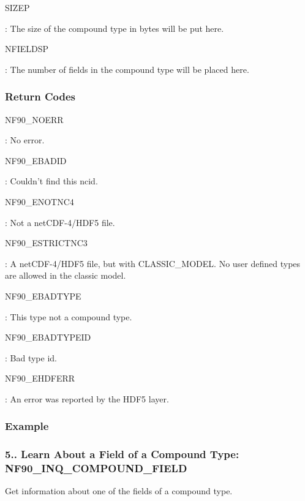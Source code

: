 {\ttfamily S\+I\+Z\+EP}

\+: The size of the compound type in bytes will be put here.

{\ttfamily N\+F\+I\+E\+L\+D\+SP}

\+: The number of fields in the compound type will be placed here.

\subsubsection*{Return Codes}

{\ttfamily N\+F90\+\_\+\+N\+O\+E\+RR}

\+: No error.

{\ttfamily N\+F90\+\_\+\+E\+B\+A\+D\+ID}

\+: Couldn’t find this ncid.

{\ttfamily N\+F90\+\_\+\+E\+N\+O\+T\+N\+C4}

\+: Not a net\+C\+D\+F-\/4/\+H\+D\+F5 file.

{\ttfamily N\+F90\+\_\+\+E\+S\+T\+R\+I\+C\+T\+N\+C3}

\+: A net\+C\+D\+F-\/4/\+H\+D\+F5 file, but with C\+L\+A\+S\+S\+I\+C\+\_\+\+M\+O\+D\+EL. No user defined types are allowed in the classic model.

{\ttfamily N\+F90\+\_\+\+E\+B\+A\+D\+T\+Y\+PE}

\+: This type not a compound type.

{\ttfamily N\+F90\+\_\+\+E\+B\+A\+D\+T\+Y\+P\+E\+ID}

\+: Bad type id.

{\ttfamily N\+F90\+\_\+\+E\+H\+D\+F\+E\+RR}

\+: An error was reported by the H\+D\+F5 layer.

\subsubsection*{Example}\hypertarget{f90-user-defined-data-types_f90-learn-about-a-field-of-a-compound-type-nf90_inq_compound_field}{}\subsubsection{5.. Learn About a Field of a Compound Type\+: N\+F90\+\_\+\+I\+N\+Q\+\_\+\+C\+O\+M\+P\+O\+U\+N\+D\+\_\+\+F\+I\+E\+LD}\label{f90-user-defined-data-types_f90-learn-about-a-field-of-a-compound-type-nf90_inq_compound_field}
Get information about one of the fields of a compound type.

